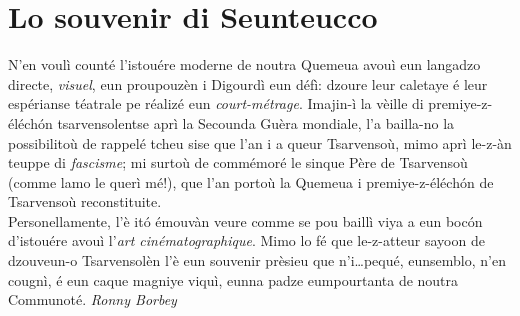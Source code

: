 \section*{Lo souvenir di Seunteucco}
\og N'en voulì counté l'istouére moderne de noutra Quemeua avouì eun langadzo directe, \textit{visuel}, eun proupouzèn i Digourdì eun défì: dzoure leur caletaye é leur espérianse téatrale pe réalizé eun \textit{court-métrage}. Imajin-ì la vèille di premiye-z-éléch\'on tsarvensolentse aprì la Secounda Guèra mondiale, l'a bailla-no la possibilitoù de rappelé tcheu sise que l'an i a queur Tsarvensoù, mimo aprì le-z-àn teuppe di \textit{fascisme}; mi surtoù de commémoré le sinque Père de Tsarvensoù (comme lamo le querì mé!), que l'an portoù la Quemeua i premiye-z-éléch\'on de Tsarvensoù reconstituite.
\\Personellamente, l'è it\'o émouvàn veure comme se pou baillì viya a eun boc\'on d'istouére avouì l'\textit{art cinématographique}. Mimo lo fé que le-z-atteur sayoon de dzouveun-o Tsarvensolèn l'è eun souvenir prèsieu que n'i\ldots pequé, eunsemblo, n'en cougnì, é eun caque magniye viquì, eunna padze eumpourtanta de noutra Communoté.
\fg{}
\newline
\newline
\hspace*{\fill} \textit{Ronny Borbey}

%
